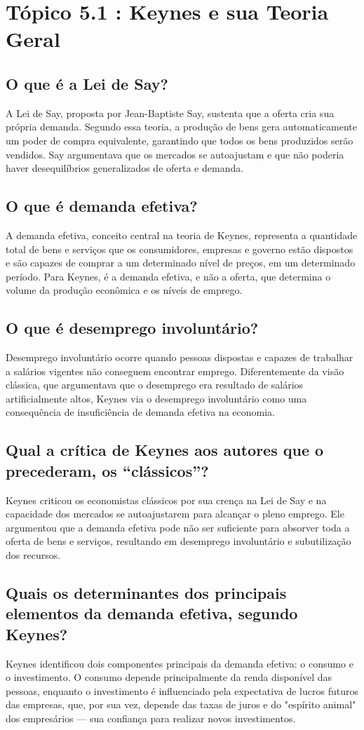 \documentclass[a4paper,12pt]{article}[abntex2]
\begin{document}
\section{\textbf{Tópico 5.1 : Keynes e sua Teoria Geral}}
\subsection{\textbf{O que é a Lei de Say?}}
A Lei de Say, proposta por Jean-Baptiste Say, sustenta que a oferta cria sua própria demanda. Segundo essa teoria, a produção de bens gera automaticamente um poder de compra equivalente, garantindo que todos os bens produzidos serão vendidos. Say argumentava que os mercados se autoajustam e que não poderia haver desequilíbrios generalizados de oferta e demanda.
\subsection{\textbf{O que é demanda efetiva?}}
A demanda efetiva, conceito central na teoria de Keynes, representa a quantidade total de bens e serviços que os consumidores, empresas e governo estão dispostos e são capazes de comprar a um determinado nível de preços, em um determinado período. Para Keynes, é a demanda efetiva, e não a oferta, que determina o volume da produção econômica e os níveis de emprego.
\subsection{\textbf{O que é desemprego involuntário?}}
Desemprego involuntário ocorre quando pessoas dispostas e capazes de trabalhar a salários vigentes não conseguem encontrar emprego. Diferentemente da visão clássica, que argumentava que o desemprego era resultado de salários artificialmente altos, Keynes via o desemprego involuntário como uma consequência de insuficiência de demanda efetiva na economia.
\subsection{\textbf{Qual a crítica de Keynes aos autores que o precederam, os “clássicos”?}}
Keynes criticou os economistas clássicos por sua crença na Lei de Say e na capacidade dos mercados se autoajustarem para alcançar o pleno emprego. Ele argumentou que a demanda efetiva pode não ser suficiente para absorver toda a oferta de bens e serviços, resultando em desemprego involuntário e subutilização dos recursos.
\subsection{\textbf{Quais os determinantes dos principais elementos da demanda efetiva, segundo Keynes?}}
Keynes identificou dois componentes principais da demanda efetiva: o consumo e o investimento. O consumo depende principalmente da renda disponível das pessoas, enquanto o investimento é influenciado pela expectativa de lucros futuros das empresas, que, por sua vez, depende das taxas de juros e do "espírito animal" dos empresários — sua confiança para realizar novos investimentos.
\end{document}
